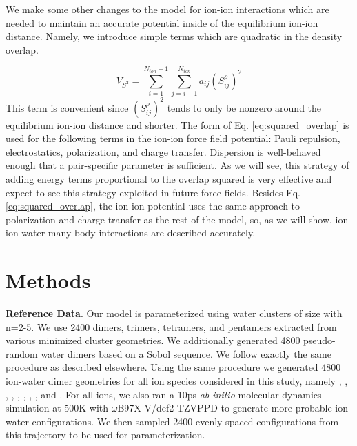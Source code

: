 \documentclass[journal=jctcce,manuscript=article]{achemso}
\begin{document}
We make some other changes to the model for ion-ion interactions which are needed to maintain an accurate potential inside of the equilibrium ion-ion distance. Namely, we introduce simple terms which are quadratic in the density overlap.

\begin{equation}
  V_{S^2}=\sum_{i=1}^{N_{ion}-1}\sum_{j=i+1}^{N_{ion}}a_{ij}(S_{ij}^\rho)^2
  \label{eq:squared_overlap}
\end{equation}
\noindent
This term is convenient since $(S_{ij}^\rho)^2$ tends to only be nonzero around the equilibrium ion-ion distance and shorter. The form of Eq. \ref{eq:squared_overlap} is used for the following terms in the ion-ion force field potential: Pauli repulsion, electrostatics, polarization, and charge transfer. Dispersion is well-behaved enough that a pair-specific parameter is sufficient. As we will see, this strategy of adding energy terms proportional to the overlap squared is very effective and expect to see this strategy exploited in future force fields. Besides Eq. \ref{eq:squared_overlap}, the ion-ion potential uses the same approach to polarization and charge transfer as the rest of the model, so, as we will show, ion-ion-water many-body interactions are described accurately.

\section*{Methods}
\textbf{Reference Data}. Our model is parameterized using water clusters of size  with n=2-5. We use 2400 dimers, trimers, tetramers, and pentamers extracted from various minimized cluster geometries. We additionally generated 4800 pseudo-random water dimers based on a Sobol sequence. We follow exactly the same procedure as described elsewhere.\cite{misquitta2008first} Using the same procedure we generated 4800 ion-water dimer geometries for all ion species considered in this study, namely , , , , , , , , and . For all ions, we also ran a 10ps \textit{ab initio} molecular dynamics simulation at 500K with $\omega$B97X-V/def2-TZVPPD to generate more probable ion-water configurations. We then sampled 2400 evenly spaced configurations from this trajectory to be used for parameterization.
\end{document}
